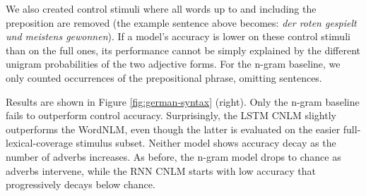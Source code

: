 We also created control stimuli where all words up to and including
the preposition are removed (the example sentence above becomes:
\textit{der roten gespielt und meistens gewonnen}). If a model's
accuracy is lower on these control stimuli than on the full ones, its
performance cannot be simply explained by the different unigram
probabilities of the two adjective forms. For the n-gram baseline, we
only counted occurrences of the prepositional phrase, omitting
sentences.

%
%
Results are shown in Figure \ref{fig:german-syntax} (right). Only the
n-gram baseline fails to outperform control accuracy. Surprisingly,
the LSTM CNLM slightly outperforms the WordNLM, even though the latter
is evaluated on the easier full-lexical-coverage stimulus subset.
Neither model shows accuracy decay as the number of adverbs increases.
As before, the n-gram model drops to chance as adverbs intervene,
while the RNN CNLM starts with low accuracy that progressively decays
below chance.


